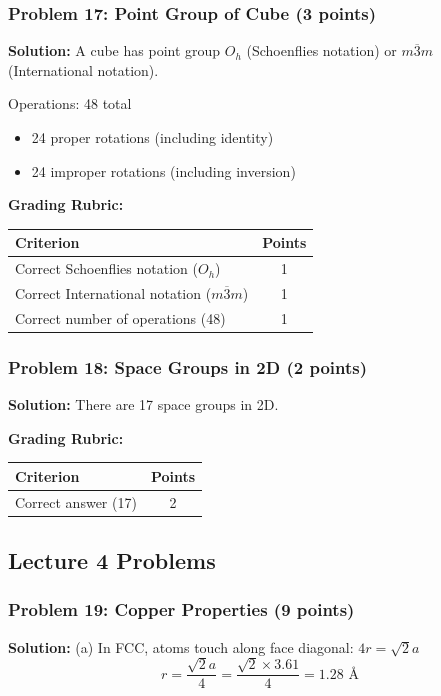 \documentclass[12pt,a4paper]{article}
\begin{document}
\subsubsection*{Problem 17: Point Group of Cube (3 points)}
\textbf{Solution:}
A cube has point group $O_h$ (Schoenflies notation) or $m\overline{3}m$ (International notation).

Operations: 48 total
\begin{itemize}
    \item 24 proper rotations (including identity)
    \item 24 improper rotations (including inversion)
\end{itemize}

\textbf{Grading Rubric:}
\begin{table}[h]
\centering
\begin{tabular}{|p{10cm}|c|}
\hline
\textbf{Criterion} & \textbf{Points} \\
\hline
Correct Schoenflies notation ($O_h$) & 1 \\
Correct International notation ($m\overline{3}m$) & 1 \\
Correct number of operations (48) & 1 \\
\hline
\end{tabular}
\end{table}

\subsubsection*{Problem 18: Space Groups in 2D (2 points)}
\textbf{Solution:}
There are 17 space groups in 2D.

\textbf{Grading Rubric:}
\begin{table}[h]
\centering
\begin{tabular}{|p{10cm}|c|}
\hline
\textbf{Criterion} & \textbf{Points} \\
\hline
Correct answer (17) & 2 \\
\hline
\end{tabular}
\end{table}

\subsection*{Lecture 4 Problems}

\subsubsection*{Problem 19: Copper Properties (9 points)}
\textbf{Solution:}
(a) In FCC, atoms touch along face diagonal: $4r = \sqrt{2}a$
\[r = \frac{\sqrt{2}a}{4} = \frac{\sqrt{2} \times 3.61}{4} = 1.28 \text{ \AA}\]
\end{document}
